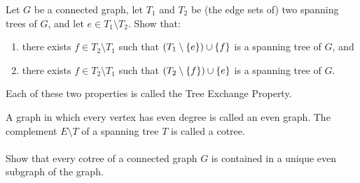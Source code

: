 \documentclass{article}
\begin{document}
\begin{exercise}
Let $G$ be a connected graph, let $T_1$ and $T_2$ be (the edge sets of) two spanning trees of $G$, and let $e\in T_1\setminus T_2$. Show that:
\begin{enumerate}
 \item there exists $f\in T_2\setminus T_1$ such that $\left( T_1\setminus\left\{ e \right\} \right)\cup\left\{ f \right\}$ is a spanning tree of $G$, and
 \item there exists $f\in T_2\setminus T_1$ such that $\left( T_2\setminus\left\{ f \right\} \right)\cup\left\{ e \right\}$ is a spanning tree of $G$.
\end{enumerate}
\begin{note}
Each of these two properties is called the Tree Exchange Property.
\end{note}
\end{exercise}

\begin{exercise}
A graph in which every vertex has even degree is called an even graph. The complement $E\setminus T$ of a spanning tree $T$ is called a cotree.
\paragraph{}
Show that every cotree of a connected graph $G$ is contained in a unique even subgraph of the graph.
\end{exercise}
\end{document}
